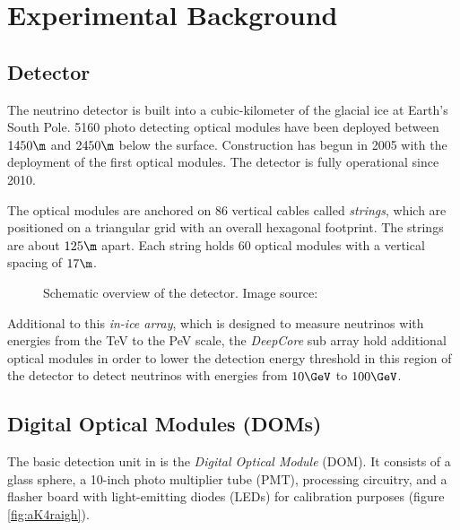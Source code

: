 
\section{Experimental Background}
\label{sec:experimental_background}

\subsection{\icecube Detector}

The \icecube neutrino detector is built into a cubic-kilometer of the glacial ice at Earth's South Pole. 5160 photo detecting optical modules have been deployed between $1450\m$ and $2450\m$ below the surface. Construction has begun in 2005 with the deployment of the first optical modules. The detector is fully operational since 2010. \cite{instrumentation}

The optical modules are anchored on 86 vertical cables called \textit{strings}, which are positioned on a triangular grid with an overall hexagonal footprint. The strings are about $125\m$ apart. Each string holds 60 optical modules with a vertical spacing of $17\m$. \cite{instrumentation}

\begin{figure}[htbp]
  \caption{Schematic overview of the \icecube detector. Image source: \cite{instrumentation}}
  \label{fig:aiThai0e}
\end{figure}

Additional to this \textit{in-ice array}, which is designed to measure neutrinos with energies from the TeV to the PeV scale, the \textit{DeepCore} sub array hold additional optical modules in order to lower the detection energy threshold in this region of the detector to detect neutrinos with energies from $10\GeV$ to $100\GeV$. \cite{instrumentation}


\subsection{Digital Optical Modules (DOMs)}
\label{sec:doms}

The basic detection unit in \icecube is the \textit{Digital Optical Module} (DOM). It consists of a glass sphere, a 10-inch photo multiplier tube (PMT), processing circuitry, and a flasher board with light-emitting diodes (LEDs) for calibration purposes (figure \ref{fig:aK4raigh}). \cite{instrumentation}

